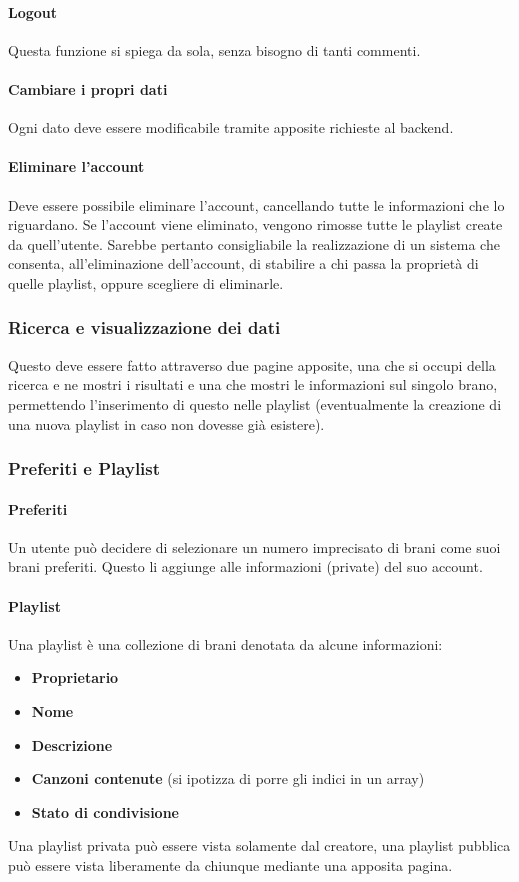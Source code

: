\paragraph{Logout} Questa funzione si spiega da sola, senza bisogno di tanti commenti.
\paragraph{Cambiare i propri dati} Ogni dato deve essere modificabile tramite apposite richieste al backend.
\paragraph{Eliminare l'account} Deve essere possibile eliminare l'account, cancellando tutte le informazioni che lo riguardano. Se l'account viene eliminato, vengono rimosse tutte le playlist create da quell'utente. Sarebbe pertanto consigliabile la realizzazione di un sistema che consenta, all'eliminazione dell'account, di stabilire a chi passa la proprietà di quelle playlist, oppure scegliere di eliminarle.
\subsubsection{Ricerca e visualizzazione dei dati}
Questo deve essere fatto attraverso due pagine apposite, una che si occupi della ricerca e ne mostri i risultati e una che mostri le informazioni sul singolo brano, permettendo l'inserimento di questo nelle playlist (eventualmente la creazione di una nuova playlist in caso non dovesse già esistere).
\subsubsection{Preferiti e Playlist}
\paragraph{Preferiti} Un utente può decidere di selezionare un numero imprecisato di brani come suoi brani preferiti. Questo li aggiunge alle informazioni (private) del suo account.
\paragraph{Playlist} Una playlist è una collezione di brani denotata da alcune informazioni:
\begin{itemize}
    \item \textbf{Proprietario}
    \item \textbf{Nome}
    \item \textbf{Descrizione}
    \item \textbf{Canzoni contenute} (si ipotizza di porre gli indici in un array)
    \item \textbf{Stato di condivisione}
\end{itemize}
Una playlist privata può essere vista solamente dal creatore, una playlist pubblica può essere vista liberamente da chiunque mediante una apposita pagina.
